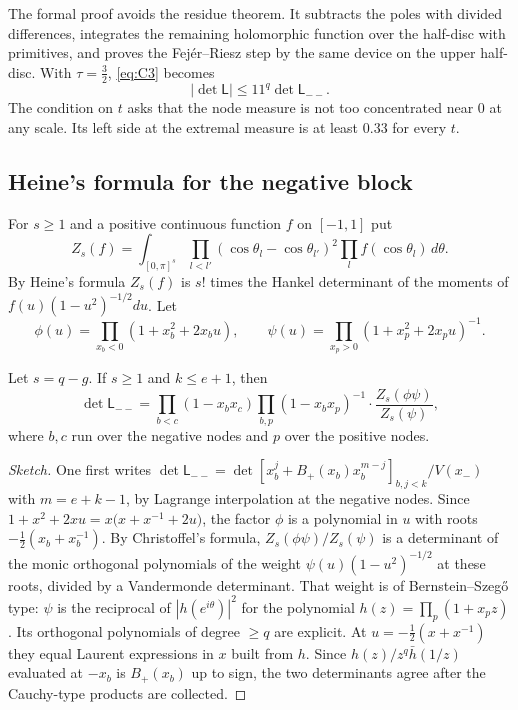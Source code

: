 The formal proof avoids the residue theorem. It subtracts the poles with divided differences, integrates
the remaining holomorphic function over the half-disc with primitives, and proves the Fej\'er--Riesz step
by the same device on the upper half-disc. With $\tau=\frac32$, \eqref{eq:C3} becomes
\begin{equation}\label{eq:eleven}
 |\det\mathsf L|\le11^q\det\mathsf L_{--}.
\end{equation}
The condition on $t$ asks that the node measure is not too concentrated near $0$ at any scale. Its left side
at the extremal measure is at least $0.33$ for every $t$.

\subsection{Heine's formula for the negative block}\label{ssec:heine}
For $s\ge1$ and a positive continuous function $f$ on $[-1,1]$ put
\[
 Z_s(f)=\int_{[0,\pi]^s}\prod_{l<l'}(\cos\theta_l-\cos\theta_{l'})^2\prod_lf(\cos\theta_l)\,d\theta .
\]
By Heine's formula $Z_s(f)$ is $s!$ times the Hankel determinant of the moments of $f(u)(1-u^2)^{-1/2}du$. Let
\[
 \phi(u)=\prod_{x_b<0}(1+x_b^2+2x_bu),\qquad \psi(u)=\prod_{x_p>0}(1+x_p^2+2x_pu)^{-1}.
\]

\begin{theorem}\label{thm:heine}
Let $s=q-g$. If $s\ge1$ and $k\le e+1$, then
\[
 \det\mathsf L_{--}=\prod_{b<c}(1-x_bx_c)\prod_{b,p}(1-x_bx_p)^{-1}\cdot\frac{Z_s(\phi\psi)}{Z_s(\psi)},
\]
where $b,c$ run over the negative nodes and $p$ over the positive nodes.
\end{theorem}

\begin{proof}[Sketch]
One first writes $\det\mathsf L_{--}=\det[x_b^j+B_+(x_b)x_b^{m-j}]_{b,j<k}/V(x_-)$ with $m=e+k-1$, by
Lagrange interpolation at the negative nodes. Since $1+x^2+2xu=x\bigl(x+x^{-1}+2u\bigr)$, the factor $\phi$
is a polynomial in $u$ with roots $-\frac12(x_b+x_b^{-1})$. By Christoffel's formula,
$Z_s(\phi\psi)/Z_s(\psi)$ is a determinant of the monic orthogonal polynomials of the weight
$\psi(u)(1-u^2)^{-1/2}$ at these roots, divided by a Vandermonde determinant. That weight is of
Bernstein--Szeg\H{o} type: $\psi$ is the reciprocal of $|h(e^{i\theta})|^2$ for the polynomial
$h(z)=\prod_p(1+x_pz)$. Its orthogonal polynomials of degree $\ge q$ are explicit. At
$u=-\frac12(x+x^{-1})$ they equal Laurent expressions in $x$ built from $h$. Since $h(z)/z^q\bar h(1/z)$
evaluated at $-x_b$ is $B_+(x_b)$ up to sign, the two determinants agree after the Cauchy-type products are
collected.
\end{proof}

